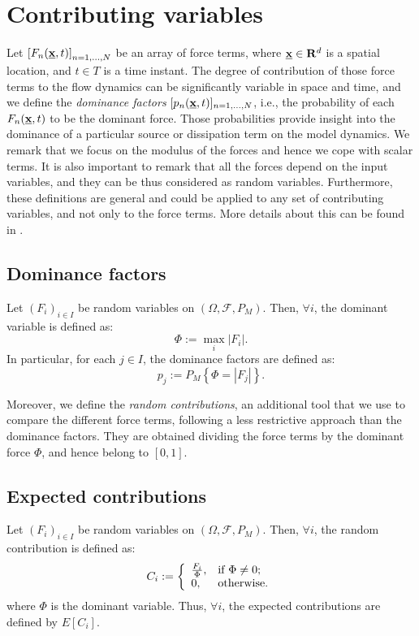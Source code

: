 \documentclass[nhess, manuscript]{copernicus}
\begin{document}
\section{Contributing variables}\label{A-2}
Let $\left[F_n(\underline{\textbf x},t)\right]_{n=1,\dots, N}$ be an array of force terms, where $\underline{\textbf x}\in \mathbf R^d$ is a spatial location, and $t\in T$ is a time instant. The degree of contribution of those force terms to the flow dynamics can be significantly variable in space and time, and we define the \emph{dominance factors} $[p_n(\underline{\textbf x},t)]_{n=1,\dots, N}$, i.e., the probability of each $F_n(\underline{\textbf x},t)$ to be the dominant force. Those probabilities provide insight into the dominance of a particular source or dissipation term on the model dynamics. We remark that we focus on the modulus of the forces and hence we cope with scalar terms. It is also important to remark that all the forces depend on the input variables, and they can be thus considered as random variables. Furthermore, these definitions are general and could be applied to any set of contributing variables, and not only to the force terms. More details about this can be found in \cite{Patra2018}.

\subsection{Dominance factors}
Let $(F_i)_{i\in I}$ be random variables on $(\Omega, \mathcal F, P_M)$. Then, $\forall i$, the dominant variable is defined as:
$$\Phi:=\max_i |F_i|.$$
In particular, for each $j \in I$, the dominance factors are defined as:
$$p_j:=P_M\left\{\Phi=|F_j|\right\}.$$

Moreover, we define the \emph{random contributions}, an additional tool that we use to compare the different force terms, following a less restrictive approach than the dominance factors. They are obtained dividing the force terms by the dominant force $\Phi$, and hence belong to $[0,1]$.

\subsection{Expected contributions}
Let $(F_i)_{i\in I}$ be random variables on $(\Omega, \mathcal F, P_M)$. Then, $\forall i$, the random contribution is defined as:
$$C_i:=\left\{
\begin{array}{ll}
      \frac{F_i}{\Phi}, & \textrm{if }\Phi\neq 0; \\
      0, & \hbox{otherwise.}
    \end{array}
  \right.$$
where $\Phi$ is the dominant variable. Thus, $\forall i$, the expected contributions are defined by $E\left[C_i\right]$.
\end{document}
